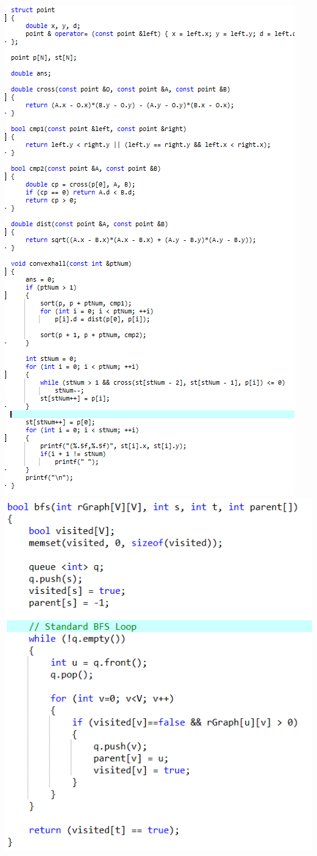 \documentclass[a4paper, landscape, 8pt]{article}
\begin{document}
\includegraphics[]{ConvaxHall} \clearpage
\includegraphics[]{MaximumFlow} \clearpage
\end{document}
